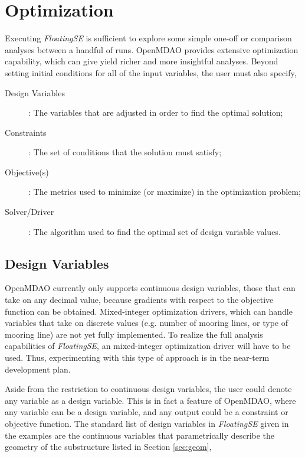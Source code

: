 \section{Optimization}
\label{sec:opt}
Executing \textit{FloatingSE} is sufficient to explore some simple
one-off or comparison analyses between a handful of runs.  OpenMDAO
provides extensive optimization capability, which can give yield richer
and more insightful analyses.  Beyond setting initial conditions for all
of the input variables, the user must also specify,
\begin{description}
\item[Design Variables]: The variables that are adjusted in order to
  find the optimal solution;
\item[Constraints]: The set of conditions that the solution must satisfy;
\item[Objective(s)]: The metrics used to minimize (or maximize) in the
  optimization problem; 
\item[Solver/Driver]: The algorithm used to find the optimal set of
  design variable values.
\end{description}

\subsection{Design Variables}
OpenMDAO currently only supports continuous design variables, those that
can take on any decimal value, because gradients with respect to the
objective function can be obtained.  Mixed-integer optimization drivers,
which can handle variables that take on discrete values (e.g. number of
mooring lines, or type of mooring line) are not yet fully implemented.
To realize the full analysis capabilities of \textit{FloatingSE}, an
mixed-integer optimization driver will have to be used.  Thus,
experimenting with this type of approach is in the near-term development
plan.

Aside from the restriction to continuous design variables, the user
could denote any variable as a design variable.  This is in fact a
feature of OpenMDAO, where any variable can be a design
variable, and any output could be a constraint or objective function.
The standard list of design variables in \textit{FloatingSE} given in
the examples are the continuous variables that parametrically describe
the geometry of the substructure listed in Section \ref{sec:geom},

